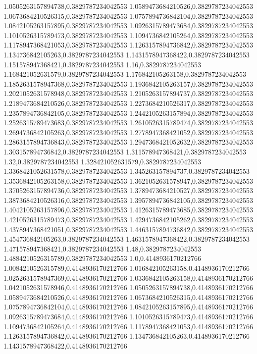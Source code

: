 1.0505263157894738,0.3829787234042553
1.0589473684210526,0.3829787234042553
1.0673684210526315,0.3829787234042553
1.0757894736842104,0.3829787234042553
1.0842105263157895,0.3829787234042553
1.0926315789473684,0.3829787234042553
1.1010526315789473,0.3829787234042553
1.1094736842105264,0.3829787234042553
1.1178947368421053,0.3829787234042553
1.1263157894736842,0.3829787234042553
1.134736842105263,0.3829787234042553
1.1431578947368422,0.3829787234042553
1.151578947368421,0.3829787234042553
1.16,0.3829787234042553
1.168421052631579,0.3829787234042553
1.176842105263158,0.3829787234042553
1.1852631578947368,0.3829787234042553
1.1936842105263157,0.3829787234042553
1.2021052631578948,0.3829787234042553
1.2105263157894737,0.3829787234042553
1.2189473684210526,0.3829787234042553
1.2273684210526317,0.3829787234042553
1.2357894736842105,0.3829787234042553
1.2442105263157894,0.3829787234042553
1.2526315789473683,0.3829787234042553
1.2610526315789474,0.3829787234042553
1.2694736842105263,0.3829787234042553
1.2778947368421052,0.3829787234042553
1.2863157894736843,0.3829787234042553
1.2947368421052632,0.3829787234042553
1.303157894736842,0.3829787234042553
1.311578947368421,0.3829787234042553
1.32,0.3829787234042553
1.328421052631579,0.3829787234042553
1.3368421052631578,0.3829787234042553
1.345263157894737,0.3829787234042553
1.3536842105263158,0.3829787234042553
1.3621052631578947,0.3829787234042553
1.3705263157894736,0.3829787234042553
1.3789473684210527,0.3829787234042553
1.3873684210526316,0.3829787234042553
1.3957894736842105,0.3829787234042553
1.4042105263157896,0.3829787234042553
1.4126315789473685,0.3829787234042553
1.4210526315789473,0.3829787234042553
1.4294736842105262,0.3829787234042553
1.4378947368421051,0.3829787234042553
1.4463157894736842,0.3829787234042553
1.454736842105263,0.3829787234042553
1.4631578947368422,0.3829787234042553
1.471578947368421,0.3829787234042553
1.48,0.3829787234042553
1.4884210526315789,0.3829787234042553
1.0,0.4148936170212766
1.0084210526315789,0.4148936170212766
1.016842105263158,0.4148936170212766
1.0252631578947369,0.4148936170212766
1.0336842105263158,0.4148936170212766
1.0421052631578946,0.4148936170212766
1.0505263157894738,0.4148936170212766
1.0589473684210526,0.4148936170212766
1.0673684210526315,0.4148936170212766
1.0757894736842104,0.4148936170212766
1.0842105263157895,0.4148936170212766
1.0926315789473684,0.4148936170212766
1.1010526315789473,0.4148936170212766
1.1094736842105264,0.4148936170212766
1.1178947368421053,0.4148936170212766
1.1263157894736842,0.4148936170212766
1.134736842105263,0.4148936170212766
1.1431578947368422,0.4148936170212766
